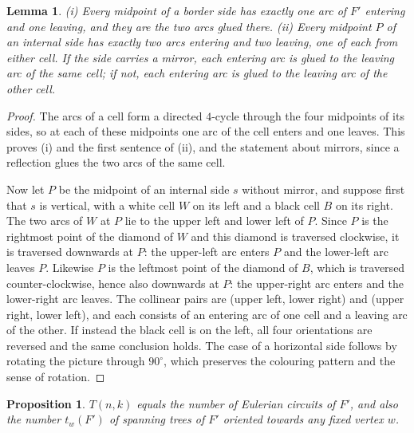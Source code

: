 \documentclass[11pt,a4paper]{amsart}
\newtheorem{lemma}[theorem]{Lemma}
\newtheorem{proposition}[theorem]{Proposition}
\theoremstyle{remark}
\begin{document}
\begin{lemma}\label{lem:orient}
\textup{(i)} Every midpoint of a border side has exactly one arc of $F'$ entering and one leaving, and they are
the two arcs glued there. \textup{(ii)} Every midpoint $P$ of an internal side has exactly two arcs entering and
two leaving, one of each from either cell. If the side carries a mirror, each entering arc is glued to the
leaving arc of the same cell; if not, each entering arc is glued to the leaving arc of the other cell.
\end{lemma}

\begin{proof}
The arcs of a cell form a directed $4$-cycle through the four midpoints of its sides, so at each of these midpoints
one arc of the cell enters and one leaves. This proves (i) and the first sentence of (ii), and the statement about
mirrors, since a reflection glues the two arcs of the same cell.

Now let $P$ be the midpoint of an internal side $s$ without mirror, and suppose first that $s$ is vertical, with a
white cell $W$ on its left and a black cell $B$ on its right. The two arcs of $W$ at $P$ lie to the upper left and
lower left of $P$. Since $P$ is the rightmost point of the diamond of $W$ and this diamond is traversed clockwise,
it is traversed downwards at $P$: the upper-left arc enters $P$ and the lower-left arc leaves $P$. Likewise $P$ is
the leftmost point of the diamond of $B$, which is traversed counter-clockwise, hence also downwards at $P$: the
upper-right arc enters and the lower-right arc leaves. The collinear pairs are (upper left, lower right) and (upper
right, lower left), and each consists of an entering arc of one cell and a leaving arc of the other. If instead the
black cell is on the left, all four orientations are reversed and the same conclusion holds. The case of a
horizontal side follows by rotating the picture through $90^\circ$, which preserves the colouring pattern and the
sense of rotation.
\end{proof}

\begin{proposition}\label{prop:BEST}
$T(n,k)$ equals the number of Eulerian circuits of $F'$, and also the number $t_w(F')$ of spanning trees of $F'$
oriented towards any fixed vertex $w$.
\end{proposition}
\end{document}
